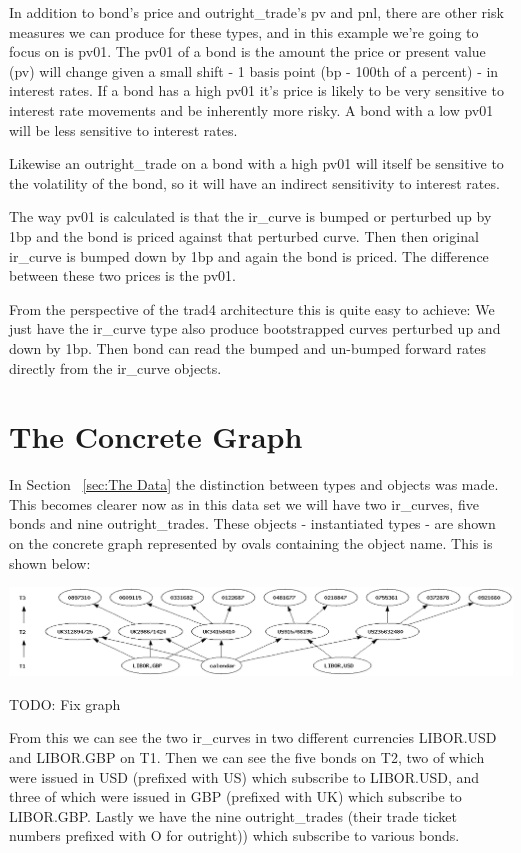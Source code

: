 \documentclass{report}
\begin{document}
In addition to bond's price and outright_trade's pv and pnl, there are other risk measures we can produce for these types, and in this example we're going to focus on is pv01. The pv01 of a bond is the amount the price or present value (pv) will change given a small shift - 1 basis point (bp - 100th of a percent) - in interest rates. If a bond has a high pv01 it's price is likely to be very sensitive to interest rate movements and be inherently more risky. A bond with a low pv01 will be less sensitive to interest rates. 

Likewise an outright_trade on a bond with a high pv01 will itself be sensitive to the volatility of the bond, so it will have an indirect sensitivity to interest rates.

The way pv01 is calculated is that the ir_curve is bumped or perturbed up by 1bp and the bond is priced against that perturbed curve. Then then original ir_curve is bumped down by 1bp and again the bond is priced. The difference between these two prices is the pv01.

From the perspective of the trad4 architecture this is quite easy to achieve: We just have the ir_curve type also produce bootstrapped curves perturbed up and down by 1bp. Then bond can read the bumped and un-bumped forward rates directly from the ir_curve objects. 

\section{The Concrete Graph}

In Section ~\ref{sec:The Data} the distinction between types and objects was made. This becomes clearer now as in this data set we will have two ir_curves, five bonds and nine outright_trades. These objects - instantiated types - are shown on the concrete graph represented by ovals containing the object name. This is shown below:

\includegraphics[scale=0.3]{bondrisksimpleconcrete.png}

TODO: Fix graph

From this we can see the two ir_curves in two different currencies LIBOR.USD and LIBOR.GBP on T1. Then we can see the five bonds on T2, two of which were issued in USD (prefixed with US) which subscribe to LIBOR.USD, and three of which were issued in GBP (prefixed with UK) which subscribe to LIBOR.GBP. Lastly we have the nine outright_trades (their trade ticket numbers prefixed with O for outright)) which subscribe to various bonds.
\end{document}

